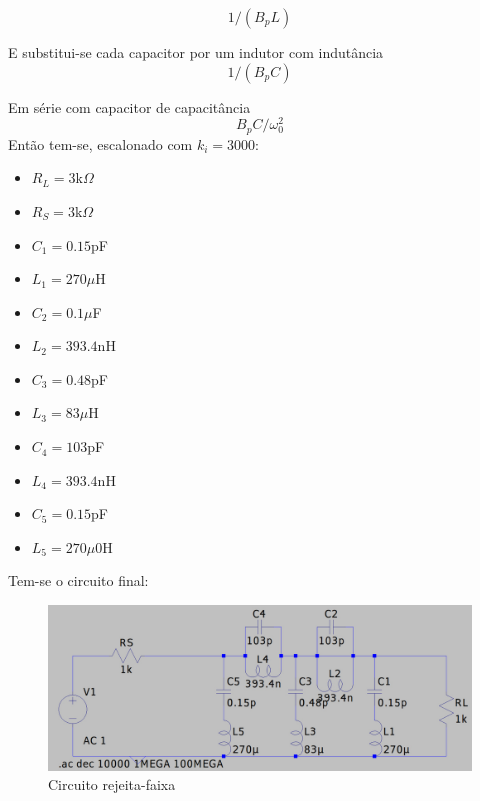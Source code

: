\documentclass[14pt, oneside]{book}
\theoremstyle{definition}
\begin{document}
            \begin{equation}
            1/(B_pL)
            \end{equation}
            
            E substitui-se cada capacitor por um indutor com indutância
            \begin{equation}
            1/(B_pC)
            \end{equation}
            
            Em série com capacitor de capacitância
            \begin{equation}
            B_pC/\omega_0^2
            \end{equation}
            Então tem-se, escalonado com $k_i = 3000$:
            \begin{itemize}
                \item $R_L = 3$k$\Omega$
                \item $R_S = 3$k$\Omega$
                \item $C_1= 0.15$pF
                \item $L_1 = 270\mu$H
                \item $C_2= 0.1\mu$F
                \item $L_2 = 393.4$nH
                \item $C_3= 0.48$pF
                \item $L_3 = 83\mu$H
                \item $C_4= 103$pF
                \item $L_4 = 393.4$nH
                \item $C_5= 0.15$pF
                \item $L_5 = 270\mu0$H
            \end{itemize}
            
            Tem-se o circuito final:
            
            \begin{figure}[H]
                \centering
                \includegraphics[scale=0.4]{rejeitacirc.jpeg}
                \caption{Circuito rejeita-faixa}
            \end{figure}
            
\end{document}
